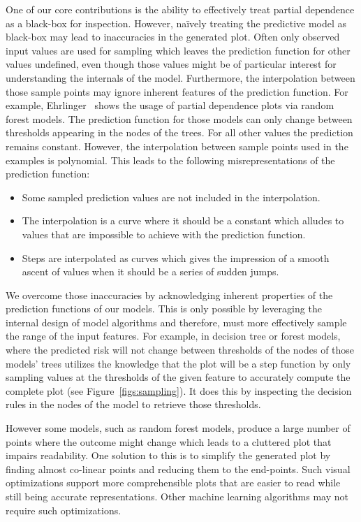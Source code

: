 
One of our core contributions is the ability to effectively treat partial dependence as a black-box for inspection.  However, na\"ively treating the predictive model as black-box may lead to inaccuracies in the generated plot.
Often only observed input values are used for sampling which leaves the prediction
function for other values undefined, even though those values might be of
particular interest for understanding the internals of the model.
Furthermore, the interpolation between those sample points may ignore inherent
features of the prediction function.
For example, Ehrlinger~\cite{ehrlinger2015} shows the usage of
partial dependence plots via random forest models.
The prediction function for those models can only change between thresholds
appearing in the nodes of the trees.
For all other values the prediction remains constant.
However, the interpolation between sample points used in the examples
is polynomial.
This leads to the following misrepresentations of the prediction function:
\begin{itemize}
\item Some sampled prediction values are not included in the interpolation.
\item The interpolation is a curve where it should be a constant which alludes to values that are impossible to achieve with the prediction function.
\item Steps are interpolated as curves which gives the impression of a smooth ascent of values when it should be a series of sudden jumps.
\end{itemize}

We overcome those inaccuracies by acknowledging inherent properties of
the prediction functions of our models.
This is only possible by leveraging the internal design of model algorithms and
therefore, \prospector must more effectively sample the range of the input features.
For example, in decision tree or forest models, where the predicted risk will not change between thresholds of the nodes of those models' trees
\prospector utilizes the knowledge that the plot will be a step function by only sampling values at the thresholds of the given feature to accurately
compute the complete plot (see Figure~\ref{figs:sampling}).
It does this by inspecting the decision rules in the nodes of the model to retrieve those thresholds.

However some models, such as random forest models, produce a large number of points
where the outcome might change which leads to a cluttered plot that impairs readability.
One solution to this is to simplify the generated plot by finding almost co-linear points and reducing them to the end-points.
Such visual optimizations support more comprehensible plots that are easier to read while still being accurate representations. Other machine learning algorithms may not require such optimizations.

